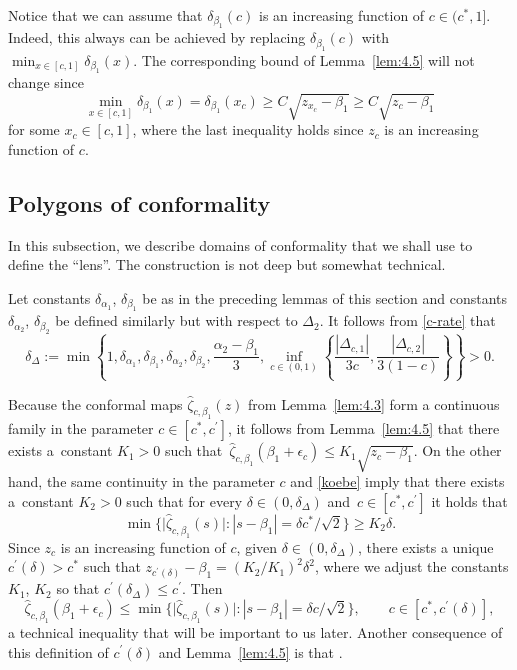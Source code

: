\documentclass[pdftex]{sigma}
\numberwithin{equation}{section}
\begin{document}
Notice that we can assume that $ \delta_{\beta_1}(c) $ is an increasing function of $ c\in(c^*,1] $. Indeed, this always can be achieved by replacing $ \delta_{\beta_1}(c) $ with $ \min_{x\in [c,1]} \delta_{\beta_1}(x) $. The corresponding bound of Lemma~\ref{lem:4.5} will not change since
\[
 \min_{x\in [c,1]} \delta_{\beta_1}(x) = \delta_{\beta_1}(x_c) \geq C \sqrt{z_{x_c}-\beta_1}\geq C\sqrt{z_c-\beta_1}
\]
for some $ x_c \in [c,1] $, where the last inequality holds since $ z_c $ is an increasing function of $ c $.


\subsection{Polygons of conformality}
\label{ss:pc}


In this subsection, we describe domains of conformality that we shall use to define the ``lens''. The construction is not deep but somewhat technical.

Let constants $ \delta_{\alpha_1}$, $\delta_{\beta_1} $ be as in the preceding lemmas of this section and constants $ \delta_{\alpha_2}$, $\delta_{\beta_2} $ be defined similarly but with respect to $ \Delta_2 $. It follows from \eqref{c-rate} that
\begin{equation}
\label{dD}
\delta_\Delta := \min\left\{ 1,\delta_{\alpha_1},\delta_{\beta_1}, \delta_{\alpha_2},\delta_{\beta_2}, \frac{\alpha_2-\beta_1}3, \inf_{c\in(0,1)}\left\{\frac{|\Delta_{c,1}|}{3c},\frac{|\Delta_{c,2}|}{3(1-c)}\right\}\right\} > 0.
\end{equation}

Because the conformal maps $ \hat\zeta_{c,\beta_1}(z) $ from Lemma~\ref{lem:4.3} form a continuous family in the parameter $ c\in[c^*,c^\prime] $, it follows from Lemma~\ref{lem:4.5} that there exists a~constant $ K_1>0 $ such that~$
\hat\zeta_{c,\beta_1}(\beta_1+\epsilon_c) \leq K_1\sqrt{z_c-\beta_1}$.
On the other hand, the same continuity in the parameter $ c $ and \eqref{koebe} imply that there exists a~constant $ K_2>0 $ such that for every $ \delta\in(0,\delta_\Delta) $ and~$ c\in[c^*,c^\prime] $ it holds that
\begin{equation}
\label{zhat-b}
\min\bigl\{ \big|\hat\zeta_{c,\beta_1}(s)\big| : |s-\beta_1|=\delta c^*/\sqrt2\bigr\} \geq K_2 \delta.
\end{equation}
Since $ z_c $ is an increasing function of $ c $, given $ \delta\in(0,\delta_\Delta) $, there exists a unique $ c^\prime(\delta)>c^* $ such that $ z_{c^\prime(\delta)} - \beta_1 = (K_2/K_1)^2\delta^2 $, where we adjust the constants $ K_1$, $K_2 $ so that $ c^\prime(\delta_\Delta)\leq c^\prime $. Then
\begin{equation}
\label{min-con}
\hat\zeta_{c,\beta_1}(\beta_1+\epsilon_c) \leq \min\bigl\{ \big|\hat\zeta_{c,\beta_1}(s)\big| : |s-\beta_1|=\delta c/\sqrt2\bigr\}, \qquad c\in[c^*,c^\prime(\delta)],
\end{equation}
a technical inequality that will be important to us later. Another consequence of this definition of $ c^\prime(\delta) $ and Lemma~\ref{lem:4.5} is that
.
\end{document}
